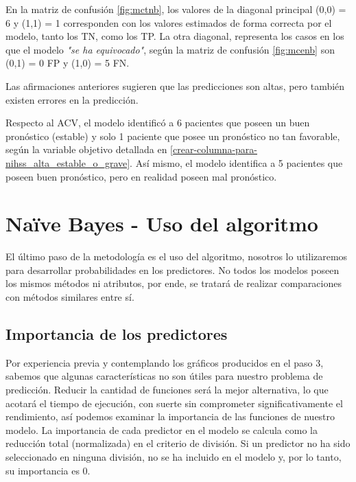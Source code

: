 	En la matriz de confusión \ref{fig:mctnb}, los valores de la diagonal principal (0,0) = 6 y (1,1) = 1 corresponden con los valores estimados de forma correcta por el modelo, tanto los TN, como los TP. La otra diagonal, representa los casos en los que el modelo \textit{"se ha equivocado"}, según la matriz de confusión \ref{fig:mcenb} son (0,1) = 0 FP y (1,0) = 5 FN.
\par Las afirmaciones anteriores sugieren que las predicciones son altas, pero también existen errores en la predicción.
\par Respecto al ACV, el modelo identificó a 6 pacientes que poseen un buen pronóstico (estable) y solo 1 paciente que posee un pronóstico no tan favorable, según la variable objetivo detallada en \ref{crear-columna-para-nihss_alta_estable_o_grave}. Así mismo, el modelo identifica a 5 pacientes que poseen buen pronóstico, pero en realidad poseen mal pronóstico.\\

    \hypertarget{nauxefve-bayes---uso-del-algoritmo}{%
\section{Naïve Bayes - Uso del algoritmo}\label{nauxefve-bayes---uso-del-algoritmo}}

	El último paso de la metodología es el uso del algoritmo, nosotros lo utilizaremos para desarrollar probabilidades en los predictores. No todos los modelos poseen los mismos métodos ni atributos, por ende, se tratará de realizar comparaciones con métodos similares entre sí.\\

    \hypertarget{importancia-de-los-predictores}{%
\subsection{Importancia de los predictores}\label{NBT:importancia-de-los-predictores}}

	Por experiencia previa y contemplando los gráficos producidos en el paso 3, sabemos que algunas características no son útiles para nuestro problema de predicción. Reducir la cantidad de funciones será la mejor alternativa, lo que acotará el tiempo de ejecución, con suerte sin comprometer significativamente el rendimiento, así podemos examinar la importancia de las funciones de nuestro modelo. La importancia de cada predictor en el modelo se calcula como la reducción total (normalizada) en el criterio de división. Si un predictor no ha sido seleccionado en ninguna división, no se ha incluido en el modelo y, por lo tanto, su importancia es 0.\\

